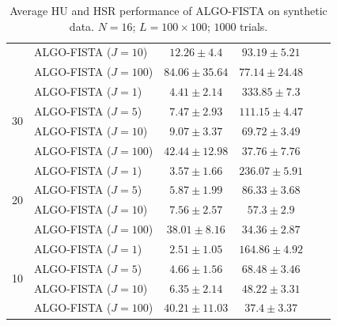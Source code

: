 \begin{table}[h]
\begin{adjustbox}{max width=\textwidth}
\begin{tabular}{|c|l|c|c|c|c|}
                    & ALGO-FISTA ($J=10$)           & $12.26    \pm 4.4$    & $93.19    \pm 5.21$  \tabularnewline
                    & ALGO-FISTA ($J=100$)          & $84.06    \pm 35.64$  & $77.14    \pm 24.48$ \tabularnewline \cline{1-4}
\multirow{4}{*}{30} & ALGO-FISTA ($J=1$)            & $4.41     \pm 2.14$   & $333.85   \pm 7.3$  \tabularnewline
                    & ALGO-FISTA ($J=5$)            & $7.47     \pm 2.93$   & $111.15   \pm 4.47$ \tabularnewline
                    & ALGO-FISTA ($J=10$)           & $9.07     \pm 3.37$   & $69.72    \pm 3.49$ \tabularnewline
                    & ALGO-FISTA ($J=100$)          & $42.44    \pm 12.98$  & $37.76    \pm 7.76$ \tabularnewline \cline{1-4}
\multirow{4}{*}{20} & ALGO-FISTA ($J=1$)            & $3.57     \pm 1.66$   & $236.07   \pm 5.91$ \tabularnewline
                    & ALGO-FISTA ($J=5$)            & $5.87     \pm 1.99$   & $86.33    \pm 3.68$ \tabularnewline
                    & ALGO-FISTA ($J=10$)           & $7.56     \pm 2.57$   & $57.3     \pm 2.9$  \tabularnewline
                    & ALGO-FISTA ($J=100$)          & $38.01    \pm 8.16$   & $34.36    \pm 2.87$ \tabularnewline \cline{1-4}
\multirow{4}{*}{10} & ALGO-FISTA ($J=1$)            & $2.51     \pm 1.05$   & $164.86   \pm 4.92$ \tabularnewline
                    & ALGO-FISTA ($J=5$)            & $4.66     \pm 1.56$   & $68.48    \pm 3.46$ \tabularnewline
                    & ALGO-FISTA ($J=10$)           & $6.35     \pm 2.14$   & $48.22    \pm 3.31$ \tabularnewline
                    & ALGO-FISTA ($J=100$)          & $40.21    \pm 11.03$  & $37.4     \pm 3.37$ \tabularnewline \cline{1-4}
\end{tabular}
\end{adjustbox}
\caption{Average HU and HSR performance of ALGO-FISTA on synthetic data.
         $N = 16$; $L = 100 \times 100$; $1000$ trials.}
\label{table:results_full_FISTA_MO16}
\end{table}

\newpage

